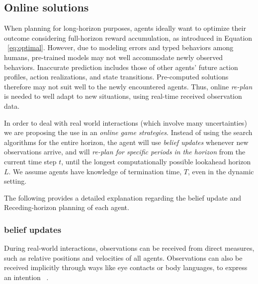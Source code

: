 \documentclass[letterpaper, 10 pt, conference]{ieeeconf}  %
\begin{document}

\subsection{Online solutions}

When planning for long-horizon purposes, agents ideally want to optimize their 
outcome considering full-horizon reward accumulation, as introduced in Equation 
~\ref{eq:optimal}. However, due to modeling errors and typed behaviors among 
humans, pre-trained models may not well accommodate newly observed behaviors. 
Inaccurate prediction includes those of other agents' future action profiles, action realizations, and state transitions. 
Pre-computed solutions therefore may not suit well to the newly 
encountered agents. Thus, online \textit{re-plan} is needed to well adapt to new 
situations, using real-time received observation data. 

In order to deal with real world interactions (which involve many uncertainties) we are proposing the use in an \textit{online game 
strategies}. Instead of using the search algorithms for the entire 
horizon, the agent will use \textit{belief updates} whenever new 
observations arrive, and will \textit{re-plan for specific periods in the horizon} from the current time step $t$, until the longest computationally possible lookahead horizon $L$. We assume agents have knowledge of termination time, $T$, even in the dynamic setting.

The following provides a detailed explanation regarding the belief update and 
Receding-horizon planning of each agent.
 
\subsubsection{belief updates}\label{sec:belief_update}
During real-world interactions, observations can be received from direct measures, such as relative positions and velocities of all agents. Observations can also be received implicitly through ways like eye contacts or body languages, to express an intention ~\cite{knepper2017implicit}.
\end{document}
